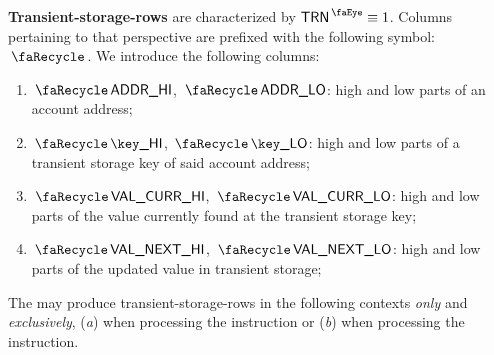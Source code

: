 \textbf{Transient-storage-rows} are characterized by $\peekTransient \equiv 1$.
Columns pertaining to that perspective are prefixed with the following symbol: $\transientSignifier$.
We introduce the following columns:
\begin{enumerate}
	\item
		$\transAddressHi$,
		$\transAddressLo$:
		high and low parts of an account address;
	\item
		$\transKeyHi$,
		$\transKeyLo$:
		high and low parts of a transient storage key of said account address;
	\item
		$\transCurrValueHi$,
		$\transCurrValueLo$:
		high and low parts of the value currently found at the transient storage key;
	\item
		$\transNextValueHi$,
		$\transNextValueLo$:
		high and low parts of the updated value in transient storage;
\end{enumerate}
\saNote{} \label{hub: storage rows: metadata for the state manager}
The \zkEvm{} may produce transient-storage-rows in the following contexts \emph{only} and \emph{exclusively},
(\emph{a}) when processing the  instruction or
(\emph{b}) when processing the  instruction.
